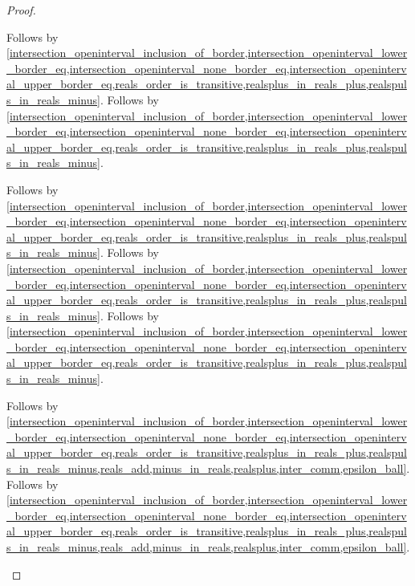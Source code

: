 \begin{proof}
\begin{byCase}
\begin{subproof}
\begin{byCase}
\begin{byCase}
                                Follows by \cref{intersection_openinterval_inclusion_of_border,intersection_openinterval_lower_border_eq,intersection_openinterval_none_border_eq,intersection_openinterval_upper_border_eq,reals_order_is_transitive,realsplus_in_reals_plus,realspuls_in_reals_minus}.
                                Follows by \cref{intersection_openinterval_inclusion_of_border,intersection_openinterval_lower_border_eq,intersection_openinterval_none_border_eq,intersection_openinterval_upper_border_eq,reals_order_is_transitive,realsplus_in_reals_plus,realspuls_in_reals_minus}.
                        \end{byCase}
                        \begin{byCase}
                                Follows by \cref{intersection_openinterval_inclusion_of_border,intersection_openinterval_lower_border_eq,intersection_openinterval_none_border_eq,intersection_openinterval_upper_border_eq,reals_order_is_transitive,realsplus_in_reals_plus,realspuls_in_reals_minus}.
                                Follows by \cref{intersection_openinterval_inclusion_of_border,intersection_openinterval_lower_border_eq,intersection_openinterval_none_border_eq,intersection_openinterval_upper_border_eq,reals_order_is_transitive,realsplus_in_reals_plus,realspuls_in_reals_minus}.
                                Follows by \cref{intersection_openinterval_inclusion_of_border,intersection_openinterval_lower_border_eq,intersection_openinterval_none_border_eq,intersection_openinterval_upper_border_eq,reals_order_is_transitive,realsplus_in_reals_plus,realspuls_in_reals_minus}.
                        \end{byCase}
                        \begin{byCase}
                                Follows by \cref{intersection_openinterval_inclusion_of_border,intersection_openinterval_lower_border_eq,intersection_openinterval_none_border_eq,intersection_openinterval_upper_border_eq,reals_order_is_transitive,realsplus_in_reals_plus,realspuls_in_reals_minus,reals_add,minus_in_reals,realsplus,inter_comm,epsilon_ball}.
                                Follows by \cref{intersection_openinterval_inclusion_of_border,intersection_openinterval_lower_border_eq,intersection_openinterval_none_border_eq,intersection_openinterval_upper_border_eq,reals_order_is_transitive,realsplus_in_reals_plus,realspuls_in_reals_minus,reals_add,minus_in_reals,realsplus,inter_comm,epsilon_ball}.

\end{byCase}
\end{byCase}
\end{subproof}
\end{byCase}
\end{proof}
